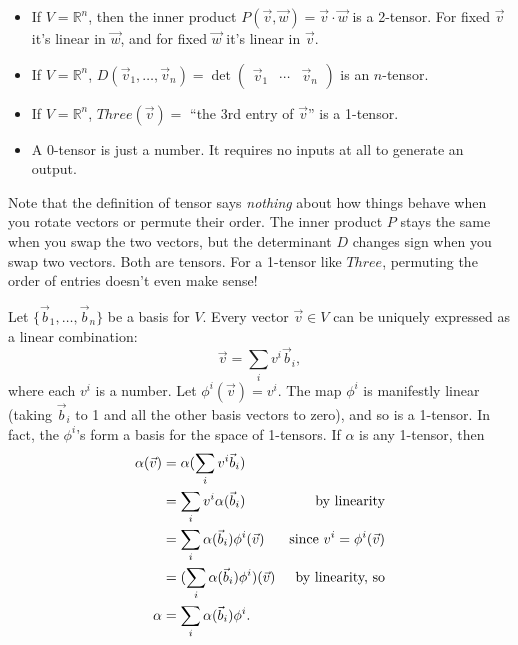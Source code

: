 \documentclass[12pt]{amsbook}
\newcommand{\R}{{\mathbb R}}
\theoremstyle{definition}
\begin{document}
\begin{itemize}
\item If $V=\R^n$, then the inner product $P(\vec v,\vec w) = \vec v
  \cdot \vec w$ is a 2-tensor. For fixed $\vec v$ it's linear in $\vec
  w$, and for fixed $\vec w$ it's linear in $\vec v$.
\item If $V=\R^n$, $D(\vec v_1,\ldots,\vec v_n) = \det \begin{pmatrix}
\vec v_1 & \cdots & \vec v_n \end{pmatrix}$ is an $n$-tensor. 
\item If $V=\R^n$, $Three(\vec v)=$ ``the 3rd entry of $\vec v$'' 
is a 1-tensor. 
\item A 0-tensor is just a number. It requires no inputs at all to generate an output. 
\end{itemize}
Note that the definition of tensor says {\em nothing} about how things
behave when you rotate vectors or permute their order. The inner product 
$P$ stays the same when you swap the two vectors, but the determinant 
$D$ changes sign when you swap two vectors. Both are tensors.
For a 1-tensor like $Three$, permuting the order of 
entries doesn't even make sense! 

Let $\{\vec b_1,\ldots, \vec b_n\}$ be a basis for $V$. Every 
vector $\vec v \in V$
can be uniquely expressed as a linear combination:
$$ \vec v = \sum_i v^i \vec b_i,$$
where each $v^i$ is a number. Let $\phi^i(\vec v) = v^i$. The map $\phi^i$
is manifestly linear (taking $\vec b_i$ to 1 and all the other basis vectors to
zero), and so is a 1-tensor. In fact, the $\phi^i$'s form a basis for 
the space of 1-tensors. If $\alpha$ is any 1-tensor, then
\begin{eqnarray}
\alpha(\vec v) & =  \alpha(\sum_i v^i \vec b_i) & \cr 
& =  \sum_i v^i \alpha(\vec b_i) & \hbox{by linearity}\cr 
& =  \sum_i \alpha(\vec b_i) \phi^i(\vec v) & \hbox{since } 
v^i=\phi^i(\vec v) \cr 
& =  ( \sum_i \alpha(\vec b_i) \phi^i) (\vec v)& \hbox{by linearity, so} \cr 
\alpha & =  \sum_i \alpha(\vec b_i) \phi^i.&
\end{eqnarray}
\end{document}
